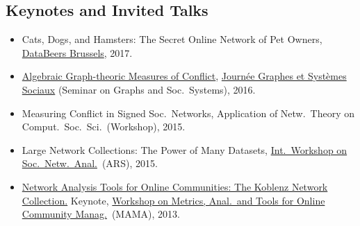 \documentclass[line,mm]{res}
\newcounter{x}
\newcounter{y}
\newcommand{\talknumber}{T\arabic{y}\stepcounter{y}}
\begin{document}
\begin{resume}
\section{Keynotes and Invited Talks}
\begin{itemize}
\item[{[\talknumber]}]
  Cats, Dogs, and Hamsters:  The Secret Online Network of Pet Owners,
  \href{http://databeers.brussels/}{DataBeers Brussels}, 2017.   
\item[{[\talknumber]}] 
  \href{https://www.slideshare.net/kunegis/algebraic-graphtheoretic-measures-of-conflict}{Algebraic Graph-theoric Measures of Conflict}, 
  \href{http://jgss.sciencesconf.org/}{Journée Graphes et Systèmes
    Sociaux} (Seminar on Graphs and Soc.\ Systems), 2016.  
\item[{[\talknumber]}] Measuring Conflict in Signed Soc.\ Networks, 
  Application of Netw.\ Theory on Comput.\ Soc.\ Sci.\ (Workshop), 2015.
\item[{[\talknumber]}] 
  Large Network Collections:  The Power of Many Datasets,
  \href{http://www.ars15.unisa.it/}{Int.\ Workshop on Soc.\ Netw.\ Anal.}\ (ARS), 2015. 
\item[{[\talknumber]}] 
  \href{https://github.com/kunegis/pdfs/blob/master/kunegis:konect-mama.presentation.pdf}{Network
    Analysis Tools for Online Communities: The Koblenz Network 
    Collection.} Keynote, \href{http://mama.west.uni-koblenz.de/}{Workshop
    on Metrics, Anal.\ and Tools for Online Community Manag.}\ (MAMA), 2013.  
\end{itemize}


\end{resume}
\end{document}
